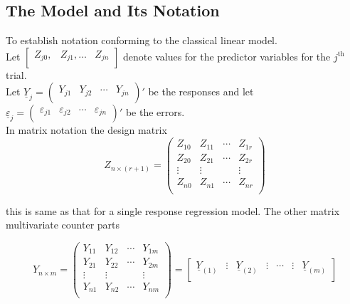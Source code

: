 \documentclass[11pt,a4paper]{article}
\theoremstyle{definition}
\begin{document}
\subsection{The Model and Its Notation}
To establish notation conforming to the classical linear model.\\
Let $\begin{bmatrix}
Z_{j0}, & Z_{j1}, \ldots& Z_{jn}\\
\end{bmatrix}
$ denote values for the predictor variables for the $j^{\text{th}}$ trial.\\
Let $\underline{Y}_j=
\begin{pmatrix}
Y_{j1} &  Y_{j2} & \cdots& Y_{jn}\\
\end{pmatrix}'$ be the responses and let $\underline{\varepsilon}_j = 
\begin{pmatrix}
\varepsilon_{j1} & \varepsilon_{j2} & \cdots& \varepsilon_{jn}\\
\end{pmatrix}'$ be the errors.\\
In matrix notation the design matrix
$$ Z_{n \times (r+1)} = 
\begin{pmatrix}
Z_{10} & Z_{11} & \cdots& Z_{1r}\\
Z_{20} & Z_{21} & \cdots& Z_{2r}\\
\vdots & \vdots &                    & \vdots\\
Z_{n0} & Z_{n1} & \cdots& Z_{nr}\\
\end{pmatrix}
$$


this is same as that for a single response regression model. The other matrix multivariate counter parts

$$Y_{n\times m} = 
\begin{pmatrix}
Y_{11} & Y_{12} & \cdots& Y_{1m}\\
Y_{21} & Y_{22} & \cdots& Y_{2m}\\
\vdots & \vdots &                    & \vdots\\
Y_{n1} & Y_{n2} & \cdots& Y_{nm}\\
\end{pmatrix}
=
\begin{bmatrix}
\underline{Y}_{(1)} & \vdots & \underline{Y}_{(2)} & \vdots & \cdots& \vdots & \underline{Y}_{(m)}\\
\end{bmatrix}
$$\\
\end{document}
